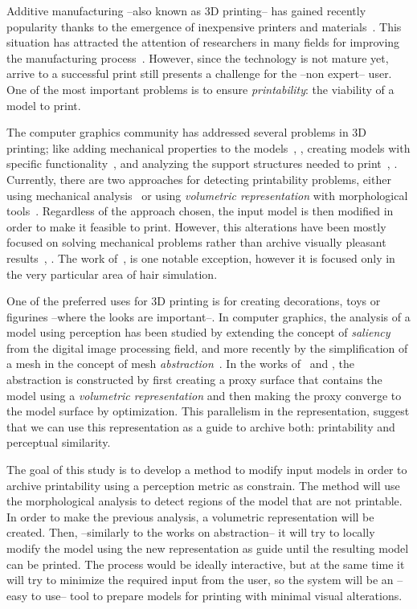 Additive manufacturing --also known as 3D printing-- has gained recently popularity thanks to the emergence of inexpensive printers and materials~\cite{Oropallo2015}. This situation has attracted the attention of researchers in many fields for improving the manufacturing process~\cite{Gao2015}. However, since the technology is not mature yet, arrive to a successful print still presents a challenge for the --non expert-- user. One of the most important problems is to ensure \emph{printability}: the viability of a model to print.

The computer graphics community has addressed several problems in 3D printing; like adding mechanical properties to the models~\cite{Li2015}, \cite{Panetta2015}, creating models with specific functionality~\cite{Song2015}, \cite{Bacher2014} and analyzing the support structures needed to print~\cite{Vanek2014}, \cite{Hu2016}. Currently, there are two approaches for detecting printability problems, either using mechanical analysis~\cite{Stava2012} or using \emph{volumetric representation} with morphological tools~\cite{Telea2011}. Regardless of the approach chosen, the input model is then modified in order to make it feasible to print. However, this alterations have been mostly focused on solving mechanical problems rather than archive visually pleasant results~\cite{Lu2014}, \cite{Zhou2013}. The work of~\cite{Echevarria2014}, is one notable exception, however it is focused only in the very particular area of hair simulation.

One of the preferred uses for 3D printing is for creating decorations, toys or figurines --where the looks are important--. In computer graphics, the analysis of a model using perception has been studied by extending the concept of \emph{saliency}~\cite{Wang2015} from the digital image processing field, and more recently by the simplification of a mesh in the concept of mesh \emph{abstraction}~\cite{DeGoes2011}. In the works of~\cite{Mehra2009} and \cite{Yumer2012}, the abstraction is constructed by first creating a proxy surface that contains the model using a \emph{volumetric representation} and then making the proxy converge to the model surface by optimization. This parallelism in the representation, suggest that we can use this representation as a guide to archive both: printability and perceptual similarity.

The goal of this study is to develop a method to modify input models in order to archive printability using a perception metric as constrain. The method will use the morphological analysis to detect regions of the model that are not printable. In order to make the previous analysis, a volumetric representation will be created. Then, --similarly to the works on abstraction-- it will try to locally modify the model using the new representation as guide until the resulting model can be printed. The process would be ideally interactive, but at the same time it will try to minimize the required input from the user, so the system will be an --easy to use-- tool to prepare models for printing with minimal visual alterations.
